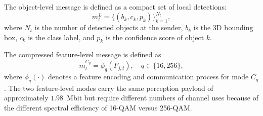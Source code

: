 \documentclass[journal]{IEEEtran}
\begin{document}
The object-level message is defined as a compact set of local detections:
\begin{equation}
m_t^L = \{(b_k, c_k, p_k)\}_{k=1}^{N_t},
\end{equation}
where $N_t$ is the number of detected objects at the sender, $b_k$ is the 3D bounding box, $c_k$ is the class label, and $p_k$ is the confidence score of object $k$.

The compressed feature-level message is defined as
\begin{equation}
m_t^{C_q} = \phi_q(F_{j,t}), \quad q \in \{16, 256\},
\end{equation}
where $\phi_q(\cdot)$ denotes a feature encoding and communication process for mode $C_q$. The two feature-level modes carry the same perception payload of approximately $1.98$~Mbit but require different numbers of channel uses because of the different spectral efficiency of 16-QAM versus 256-QAM.
\end{document}

